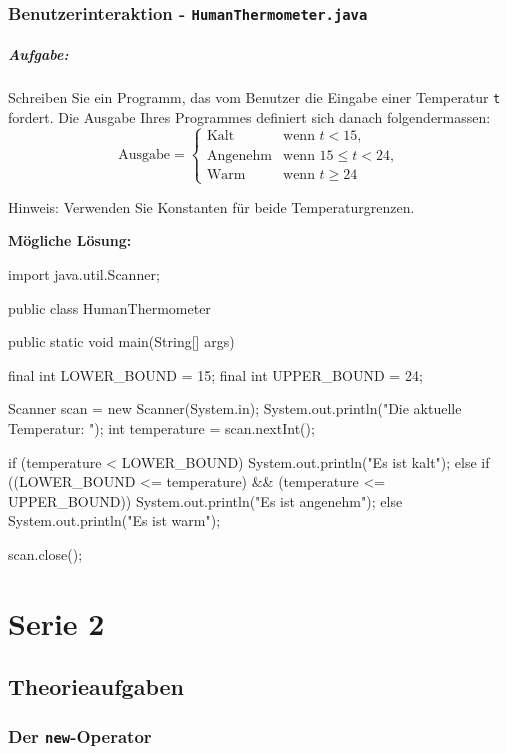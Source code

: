 \documentclass[a4paper,10pt, dvipsnames]{report}
\begin{document}
\subsection{Benutzerinteraktion - \texttt{HumanThermometer.java}}

\paragraph{Aufgabe:}
Schreiben Sie ein Programm, das vom Benutzer die Eingabe einer Temperatur \texttt{t} fordert. Die Ausgabe Ihres Programmes definiert sich danach folgendermassen:
\[
\text{Ausgabe} = 
\begin{cases} 
\text{Kalt} & \text{wenn } t < 15, \\
\text{Angenehm} & \text{wenn } 15 \leq t < 24, \\
\text{Warm} & \text{wenn } t \geq 24 
\end{cases}
\]

Hinweis: Verwenden Sie Konstanten für beide Temperaturgrenzen.

\textbf{Mögliche Lösung:}

\begin{javacodebox}
import java.util.Scanner;

public class HumanThermometer {
    public static void main(String[] args) {
		final int LOWER_BOUND = 15;
		final int UPPER_BOUND = 24;
		
		Scanner scan = new Scanner(System.in);
		System.out.println("Die aktuelle Temperatur: ");
		int temperature = scan.nextInt();
		
		if (temperature < LOWER_BOUND) {
			System.out.println("Es ist kalt");
		} 
		else if ((LOWER_BOUND <= temperature) && (temperature <= UPPER_BOUND)) {
			System.out.println("Es ist angenehm");
		} 
		else
			System.out.println("Es ist warm");
		
		scan.close();
	}
}
\end{javacodebox}

\chapter{Serie 2}
\section{Theorieaufgaben}
\subsection{Der \texttt{new}-Operator}
\end{document}
